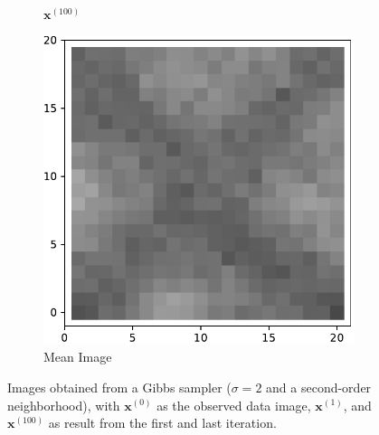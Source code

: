 \begin{figure}[!h]
\begin{subfigure}[b]{0.24\textwidth}
            \caption[]%
            {{\small $\mathbf{x}^{(100)}$}}    
            \label{fig:2d2100}
        \end{subfigure}
        \begin{subfigure}[b]{0.24\textwidth}   
            \centering 
            \includegraphics[width=\textwidth]{./img/2d2mean.pdf}
            \caption[]%
            {{\small Mean Image}}    
            \label{fig:2d2mean}
        \end{subfigure}
        \caption[]
        {\small Images obtained from a Gibbs sampler ($\sigma=2$ and a second-order neighborhood), with $\mathbf{x}^{(0)}$ as the observed data image, $\mathbf{x}^{(1)}$, and $\mathbf{x}^{(100)}$ as result from the first and last iteration. }
        \label{fig:2d2}
    \end{figure}
